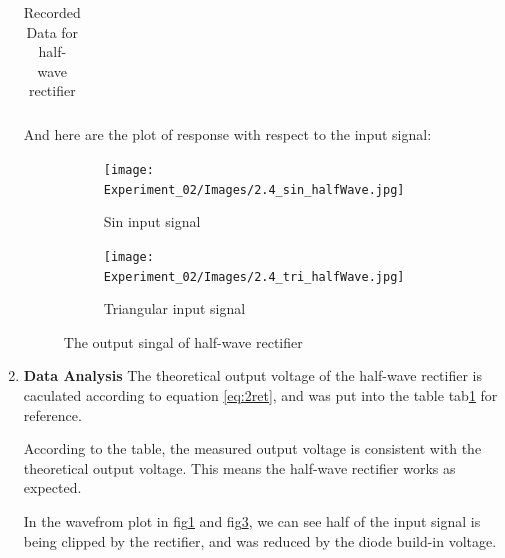 \begin{enumerate}[I]
\begin{table}[H]
\begin{tabular}{l|cccccccc}
                    \midrule
                \end{tabular}
                \caption{Recorded Data for half-wave rectifier}
                \label{tab:2ret}
            \end{table}
        And here are the plot of response with respect to the input signal:
        \begin{figure}[H]
            \centering
            \begin{subfigure}{0.45\textwidth}
                \texttt{[image: Experiment\_02/Images/2.4\_sin\_halfWave.jpg]}
                \caption{Sin input signal}
                \label{wave:2aSin}
            \end{subfigure}
            \begin{subfigure}{0.45\textwidth}
                \texttt{[image: Experiment\_02/Images/2.4\_tri\_halfWave.jpg]}
                \caption{Triangular input signal}
                \label{wave:2aTri}
            \end{subfigure}
            \caption{The output singal of half-wave rectifier}
        \end{figure}

        \item \textbf{Data Analysis}\newline
            The theoretical output voltage of the half-wave rectifier is caculated according to equation \ref{eq:2ret}, and was put into the table tab\ref{tab:2ret} for reference.\par

            According to the table, the measured output voltage is consistent with the theoretical output voltage. This means the half-wave rectifier works as expected.\par

            In the wavefrom plot in fig\ref{wave:2aSin} and fig\ref{wave:2aTri}, we can see half of the input signal is being clipped by the rectifier, and was reduced by the diode build-in voltage.\par
    \end{enumerate}


